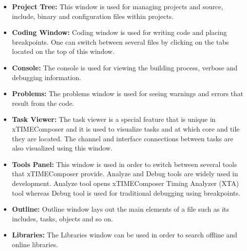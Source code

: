 \begin{itemize}
	\item \textbf{Project Tree:} This window is used for managing projects and source, include, binary and configuration files within projects.
	\item \textbf{Coding Window:} Coding window is used for writing code and placing breakpoints. One can switch between several files by clicking on the tabs located on the top of this window.
	\item \textbf{Console:} The console is used for viewing the building process, verbose and debugging information.
	\item \textbf{Problems:} The problems window is used for seeing warnings and errors that result from the code.
	\item \textbf{Task Viewer:} The task viewer is a special feature that is unique in xTIMEComposer and it is used to visualize tasks and at which core and tile they are located. The channel and interface connections between tasks are also visualized using this window.
	\item \textbf{Tools Panel:} This window is used in order to switch between several tools that xTIMEComposer provide. Analyze and Debug tools are widely used in development. Analyze tool opens xTIMEComposer Timing Analyzer (XTA) tool whereas Debug tool is used for traditional debugging using breakpoints.
	\item \textbf{Outline:} Outline window lays out the main elements of a file such as its includes, tasks, objects and so on.
	\item \textbf{Libraries:} The Libraries window can be used in order to search offline and online libraries.
\end{itemize}
